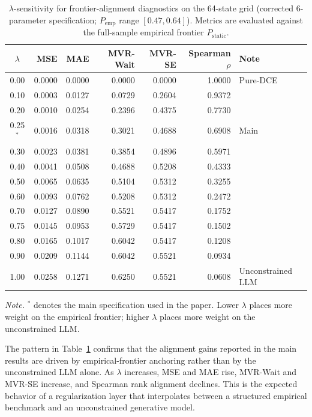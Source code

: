 \documentclass[11pt]{article}
\begin{document}
\begin{table}[htbp]
\centering
\caption{$\lambda$-sensitivity for frontier-alignment diagnostics on the 64-state grid (corrected 6-parameter specification; $P_{\text{emp}}$ range $[0.47, 0.64]$). Metrics are evaluated against the full-sample empirical frontier $P_{\text{static}}$.}
\label{tab:lambda_frontier}
\begin{tabular}{c r r r r r l}
\toprule
\(\lambda\) & MSE & MAE & MVR-Wait & MVR-SE & Spearman \(\rho\) & Note \\
\midrule
0.00 & 0.0000 & 0.0000 & 0.0000 & 0.0000 & 1.0000 & Pure-DCE \\
0.10 & 0.0003 & 0.0127 & 0.0729 & 0.2604 & 0.9372 &  \\
0.20 & 0.0010 & 0.0254 & 0.2396 & 0.4375 & 0.7730 &  \\
0.25\(^*\) & 0.0016 & 0.0318 & 0.3021 & 0.4688 & 0.6908 & Main \\
0.30 & 0.0023 & 0.0381 & 0.3854 & 0.4896 & 0.5971 &  \\
0.40 & 0.0041 & 0.0508 & 0.4688 & 0.5208 & 0.4333 &  \\
0.50 & 0.0065 & 0.0635 & 0.5104 & 0.5312 & 0.3255 &  \\
0.60 & 0.0093 & 0.0762 & 0.5208 & 0.5312 & 0.2472 &  \\
0.70 & 0.0127 & 0.0890 & 0.5521 & 0.5417 & 0.1752 &  \\
0.75 & 0.0145 & 0.0953 & 0.5729 & 0.5417 & 0.1502 &  \\
0.80 & 0.0165 & 0.1017 & 0.6042 & 0.5417 & 0.1208 &  \\
0.90 & 0.0209 & 0.1144 & 0.6042 & 0.5521 & 0.0934 &  \\
1.00 & 0.0258 & 0.1271 & 0.6250 & 0.5521 & 0.0608 & Unconstrained LLM \\
\bottomrule
\end{tabular}

\vspace{0.3em}
\begin{minipage}{0.92\textwidth}
\small
\textit{Note.} \(^*\) denotes the main specification used in the paper. Lower \(\lambda\) places more weight on the empirical frontier; higher \(\lambda\) places more weight on the unconstrained LLM.
\end{minipage}
\end{table}

The pattern in Table~\ref{tab:lambda_frontier} confirms that the alignment gains reported in the main results are driven by empirical-frontier anchoring rather than by the unconstrained LLM alone. As \(\lambda\) increases, MSE and MAE rise, MVR-Wait and MVR-SE increase, and Spearman rank alignment declines. This is the expected behavior of a regularization layer that interpolates between a structured empirical benchmark and an unconstrained generative model.
\end{document}
